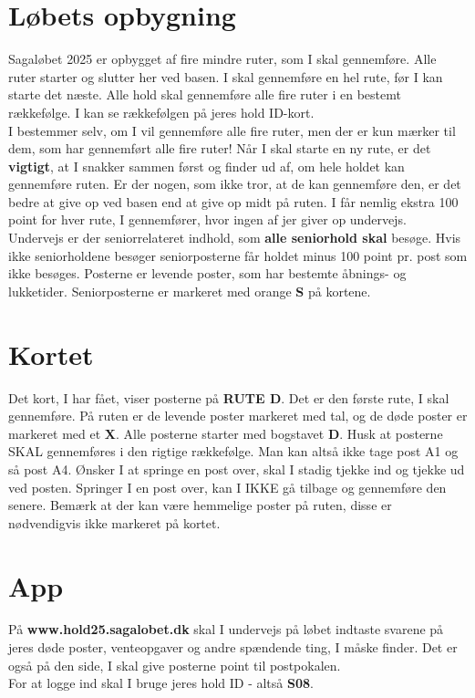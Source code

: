 \section{Løbets opbygning}
Sagaløbet 2025 er opbygget af fire mindre ruter, som I skal gennemføre. Alle ruter starter og slutter her ved basen. I skal gennemføre en hel rute, før I kan starte det næste. Alle hold skal gennemføre alle fire ruter i en bestemt rækkefølge. I kan se rækkefølgen på jeres hold ID-kort.\\\newline
I bestemmer selv, om I vil gennemføre alle fire ruter, men der er kun mærker til dem, som har gennemført alle fire ruter! Når I skal starte en ny rute, er det \textbf{vigtigt}, at I snakker sammen først og finder ud af, om hele holdet kan gennemføre ruten. Er der nogen, som ikke tror, at de kan gennemføre den, er det bedre at give op ved basen end at give op midt på ruten. I får nemlig ekstra 100 point for hver rute, I gennemfører, hvor ingen af jer giver op undervejs.\\
\newline
Undervejs er der seniorrelateret indhold, som \textbf{alle seniorhold skal} besøge. Hvis ikke seniorholdene besøger seniorposterne får holdet minus 100 point pr. post som ikke besøges. Posterne er levende poster, som har bestemte åbnings- og lukketider. Seniorposterne er markeret med orange \textbf{S} på kortene.\\
\newline
\section{Kortet}
Det kort, I har fået, viser posterne på \textbf{RUTE D}. Det er den første rute, I skal gennemføre. På ruten er de levende poster markeret med tal, og de døde poster er markeret med et \textbf{X}. Alle posterne starter med bogstavet \textbf{D}. Husk at posterne SKAL gennemføres i den rigtige rækkefølge. Man kan altså ikke tage post A1 og så post A4. Ønsker I at springe en post over, skal I stadig tjekke ind og tjekke ud ved posten. Springer I en post over, kan I IKKE gå tilbage og gennemføre den senere. Bemærk at der kan være hemmelige poster på ruten, disse er nødvendigvis ikke markeret på kortet.
\section{App}
På \textbf{www.hold25.sagalobet.dk} skal I undervejs på løbet indtaste svarene på jeres døde poster, venteopgaver og andre spændende ting, I måske finder. Det er også på den side, I skal give posterne point til postpokalen.\\
For at logge ind skal I bruge jeres hold ID - altså \textbf{S08}.
\newpage
